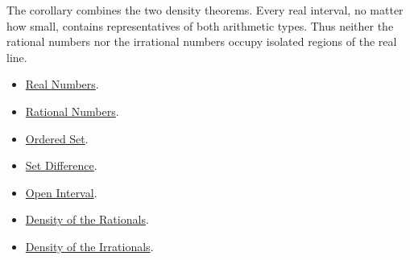 \begin{remark*}[Interpretation]
The corollary combines the two density theorems. Every real interval, no matter how small, contains representatives of both arithmetic types. Thus neither the rational numbers nor the irrational numbers occupy isolated regions of the real line.
\end{remark*}

\begin{dependencies}
\begin{itemize}
\item \hyperref[def:reals]{Real Numbers}.
\item \hyperref[def:rationals]{Rational Numbers}.
\item \hyperref[def:ordered-set]{Ordered Set}.
\item \hyperref[def:set-difference]{Set Difference}.
\item \hyperref[def:open-interval]{Open Interval}.
\item \hyperref[thm:density-of-rationals-in-reals]{Density of the Rationals}.
\item \hyperref[thm:density-of-irrationals-in-reals]{Density of the Irrationals}.
\end{itemize}
\end{dependencies}








